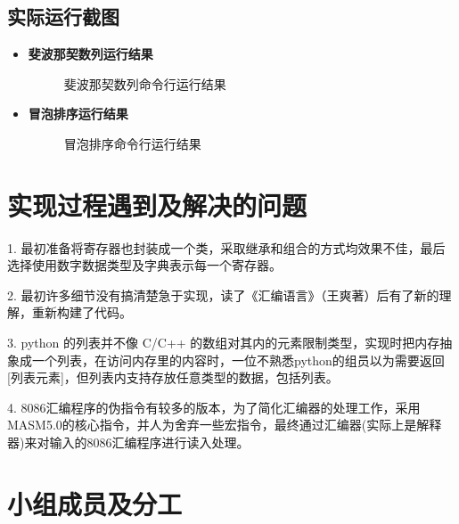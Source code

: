 \documentclass[UTF8,12pt]{article}
\begin{document}
	\subsection{实际运行截图}
	\begin{itemize}
	    \item \textbf{斐波那契数列运行结果}
	    \begin{figure}[H]
    	    \centering
    	    \caption{斐波那契数列命令行运行结果}
    	    \label{斐波那契数列命令行运行结果}
	    \end{figure}


        \item \textbf{冒泡排序运行结果}
	    \begin{figure}[H]
    	    \centering
    	    \caption{冒泡排序命令行运行结果}
    	    \label{冒泡排序命令行运行结果}
	    \end{figure} 
	 \end{itemize}
	\section{实现过程遇到及解决的问题}
	1. 最初准备将寄存器也封装成一个类，采取继承和组合的方式均效果不佳，最后选择使用数字数据类型及字典表示每一个寄存器。
	
	2. 最初许多细节没有搞清楚急于实现，读了《汇编语言》（王爽著）后有了新的理解，重新构建了代码。
	
	3. python 的列表并不像 C/C++ 的数组对其内的元素限制类型，实现时把内存抽象成一个列表，在访问内存里的内容时，一位不熟悉python的组员以为需要返回 [列表元素]，但列表内支持存放任意类型的数据，包括列表。
	
	4. 8086汇编程序的伪指令有较多的版本，为了简化汇编器的处理工作，采用MASM5.0的核心指令，并人为舍弃一些宏指令，最终通过汇编器(实际上是解释器)来对输入的8086汇编程序进行读入处理。
	
	\section{小组成员及分工}	
\end{document}
